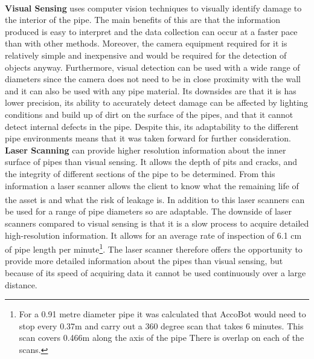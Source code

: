 \documentclass[11pt]{article}		%
\newcommand{\supercite}[1]{\textsuperscript{\cite{#1}}}		%
\begin{document}
	        \\\hspace*{2ex}	
			\textbf{Visual Sensing} uses computer vision techniques to visually identify damage to the interior of the pipe. The main benefits of this are that the information produced is easy to interpret and the data collection can occur at a faster pace than with other methods. Moreover, the camera equipment required for it is relatively simple and inexpensive and would be required for the detection of objects anyway. Furthermore, visual detection can be used with a wide range of diameters since the camera does not need to be in close proximity with the wall and it can also be used with any pipe material. Its downsides are that it is has lower precision, its ability to accurately detect damage can be affected by lighting conditions and build up of dirt on the surface of the pipes, and that it cannot detect internal defects in the pipe. Despite this, its adaptability to the different pipe environments means that it was taken forward for further consideration. 
	\\\hspace*{2ex}	
	        \textbf{Laser Scanning} can provide higher resolution information about the inner surface of pipes than visual sensing. It allows the depth of pits and cracks, and the integrity of different sections of the pipe to be determined. From this information a laser scanner allows the client to know what the remaining life of the asset is and what the risk of leakage is\supercite{2g_robotics}. In addition to this laser scanners can be used for a range of pipe diameters so are adaptable. The downside of laser scanners compared to visual sensing is that it is a slow process to acquire detailed high-resolution information. It allows for an average rate of inspection of 6.1 cm of pipe length per minute\supercite{2g_robotics}\footnote{For a 0.91 metre diameter pipe it was calculated that AccoBot would need to stop every 0.37m and carry out a 360 degree scan that takes 6 minutes. This scan covers 0.466m along the axis of the pipe There is overlap on each of the scans.}. The laser scanner therefore offers the opportunity to provide more detailed information about the pipes than visual sensing, but because of its speed of acquiring data it cannot be used continuously over a large distance.
	        
\end{document}
